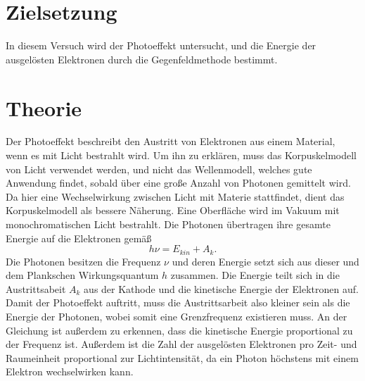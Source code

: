 \section{Zielsetzung}
\label{sec:Zielsetzung}
In diesem Versuch wird der Photoeffekt untersucht, und die Energie der ausgelösten Elektronen durch die Gegenfeldmethode bestimmt.
\section{Theorie}
\label{sec:Theorie}

Der Photoeffekt beschreibt den Austritt von Elektronen aus einem Material, wenn es mit Licht bestrahlt wird. 
Um ihn zu erklären, muss das Korpuskelmodell von Licht verwendet werden, und nicht das Wellenmodell, welches gute Anwendung findet, sobald über eine große Anzahl von Photonen gemittelt wird. Da hier eine Wechselwirkung zwischen Licht mit Materie stattfindet, dient das Korpuskelmodell als bessere Näherung. Eine Oberfläche wird im Vakuum mit monochromatischen Licht bestrahlt. Die Photonen übertragen ihre gesamte Energie auf die Elektronen gemäß
\begin{equation}
h \nu = E_{kin} + A_k .
\end{equation}
Die Photonen besitzen die Frequenz $\nu$ und deren Energie setzt sich aus dieser und dem Plankschen Wirkungsquantum $h$ zusammen. Die Energie teilt sich in die Austrittsabeit $A_k$ aus der Kathode und die kinetische Energie der Elektronen auf. 
Damit der Photoeffekt auftritt, muss die Austrittsarbeit also kleiner sein als die Energie der Photonen, wobei somit eine Grenzfrequenz existieren muss. 
An der Gleichung ist außerdem zu erkennen, dass die kinetische Energie proportional zu der Frequenz ist.
Außerdem ist die Zahl der ausgelösten Elektronen pro Zeit- und Raumeinheit proportional zur Lichtintensität, da ein Photon höchstens mit einem Elektron wechselwirken kann.


